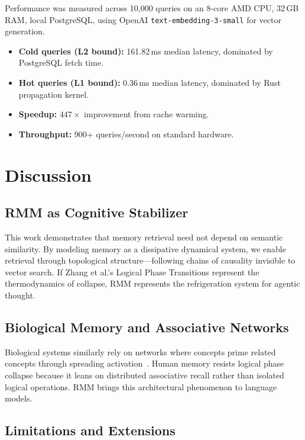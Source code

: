 \documentclass[11pt]{article}
\begin{document}
Performance was measured across 10,000 queries on an 8-core AMD CPU,
32\,GB RAM, local PostgreSQL, using OpenAI
\texttt{text-embedding-3-small} for vector generation.

\begin{itemize}
  \item \textbf{Cold queries (L2 bound):} 161.82\,ms median latency,
        dominated by PostgreSQL fetch time.
  \item \textbf{Hot queries (L1 bound):} 0.36\,ms median latency,
        dominated by Rust propagation kernel.
  \item \textbf{Speedup:} $447\times$ improvement from cache warming.
  \item \textbf{Throughput:} 900+ queries/second on standard hardware.
\end{itemize}

\section{Discussion}

\subsection{RMM as Cognitive Stabilizer}

This work demonstrates that memory retrieval need not depend on semantic
similarity. By modeling memory as a dissipative dynamical system, we
enable retrieval through topological structure---following chains of
causality invisible to vector search. If Zhang et al.'s Logical Phase
Transitions represent the thermodynamics of collapse, RMM represents the
refrigeration system for agentic thought.

\subsection{Biological Memory and Associative Networks}

Biological systems similarly rely on networks where concepts prime
related concepts through spreading
activation~\cite{collins1975}. Human memory resists logical phase
collapse because it leans on distributed associative recall rather than
isolated logical operations. RMM brings this architectural phenomenon to
language models.

\subsection{Limitations and Extensions}
\end{document}
